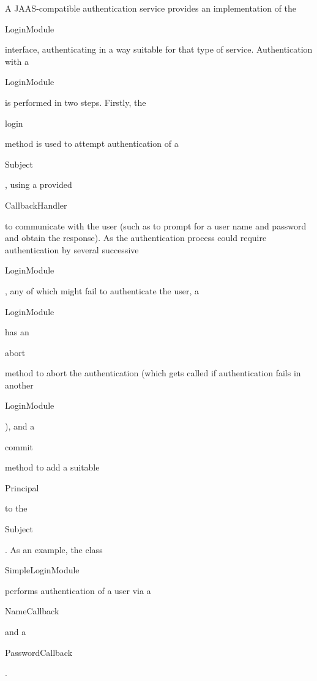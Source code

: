 A JAAS-compatible authentication service provides an implementation of the
\begin{code}LoginModule\end{code} interface, authenticating in a way
suitable for that type of service.
Authentication with a \begin{code}LoginModule\end{code} is performed
in two steps. Firstly, the \begin{code}login\end{code} method is used to
attempt authentication of a \begin{code}Subject\end{code},
using a provided \begin{code}CallbackHandler\end{code} to communicate
with the user (such as to prompt for a user name and password and obtain
the response).
As the authentication process could require authentication by several
successive \begin{code}LoginModule\end{code}, any of which might fail to authenticate
the user,
a \begin{code}LoginModule\end{code} has an \begin{code}abort\end{code} method
to abort the authentication (which gets called if authentication fails in another
\begin{code}LoginModule\end{code}), and a \begin{code}commit\end{code} method
to add a suitable \begin{code}Principal\end{code} to the \begin{code}Subject\end{code}.
As an example, the class \begin{code}SimpleLoginModule\end{code}
performs authentication of a user via a \begin{code}NameCallback\end{code}
and a \begin{code}PasswordCallback\end{code}.
